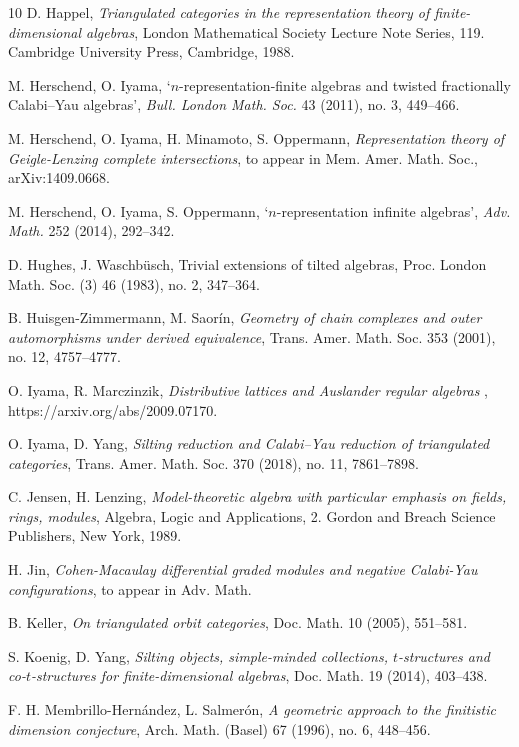 \documentclass[a4paper,reqno,11pt]{amsart}
\theoremstyle{definition}
\newcommand{\new}[1]{{\blue #1}}
\numberwithin{equation}{section}
\begin{document}
\begin{thebibliography}{10}
 D. Happel, \emph{Triangulated categories in the representation theory of finite-dimensional algebras}, London Mathematical Society Lecture Note Series, 119. Cambridge University Press, Cambridge, 1988. 

{\sc M. Herschend, O. Iyama},
`{{$n$}-representation-finite algebras and twisted fractionally Calabi--Yau algebras}',
{\it Bull. London Math. Soc.} 43 (2011), no. 3, 449--466.

\new{ M. Herschend, O. Iyama, H. Minamoto, S. Oppermann, \emph{Representation theory of Geigle-Lenzing complete intersections}, to appear in Mem. Amer. Math. Soc., arXiv:1409.0668.}

{\sc M. Herschend, O. Iyama, S. Oppermann}, 
`{{$n$}-representation infinite algebras}',
{\it Adv. Math.} 252 (2014), 292--342.

 D. Hughes, J. Waschb\"usch, Trivial extensions of tilted algebras, Proc. London Math. Soc. (3) 46 (1983), no. 2, 347--364.

\new{ B. Huisgen-Zimmermann, M. Saorín, \emph{Geometry of chain complexes and outer automorphisms under derived equivalence}, Trans. Amer. Math. Soc. 353 (2001), no. 12, 4757--4777.}

 O. Iyama, R. Marczinzik, \emph{Distributive lattices and Auslander regular algebras} , https://arxiv.org/abs/2009.07170.

 O. Iyama, D. Yang, \emph{Silting reduction and Calabi--Yau reduction of triangulated categories}, Trans. Amer. Math. Soc. 370 (2018), no. 11, 7861--7898.

\new{
 C. Jensen, H. Lenzing, \emph{Model-theoretic algebra with particular emphasis on fields, rings, modules}, Algebra, Logic and Applications, 2. Gordon and Breach Science Publishers, New York, 1989.}

 H. Jin, \emph{Cohen-Macaulay differential graded modules and negative Calabi-Yau configurations}, to appear in Adv. Math.

 B. Keller, \emph{On triangulated orbit categories}, Doc. Math. 10 (2005), 551--581.

 S. Koenig, D. Yang, \emph{Silting objects, simple-minded collections, $t$-structures and co-$t$-structures for finite-dimensional algebras}, Doc. Math. 19 (2014), 403--438. 

\new{
 F. H. Membrillo-Hernández, L. Salmerón, \emph{A geometric approach to the finitistic dimension conjecture}, Arch. Math. (Basel) 67 (1996), no. 6, 448--456.
}


\end{thebibliography}
\end{document}
